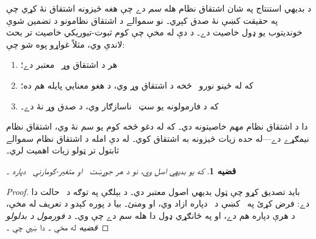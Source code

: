 \documentclass[12pt,a4paper,oneside]{report}
\newcommand{\olfileid}[3]{\gdef\pspart{#1}\gdef\pschapter{#2}\gdef\pssection{#3}}
\gdef\pspart{#2}\gdef\pschapter{#3}\gdef\pssection{}%
\newtheorem{prop}[thm]{قضيه}
\theoremstyle{definition}
\newenvironment{explain}{}{}
\begin{document}
\label{olpseg:OLP-0124-B004:start}
\olfileid{fol}{axd}{sou}
\label{olpseg:OLP-0124-B004:end}

\label{olpseg:OLP-0124-B005:start}
\label{olpseg:OLP-0124-B005:end}

\label{olpseg:OLP-0124-B006:start}
\begin{explain}
د بديهي استنتاج په شان اشتقاق نظام هله \emph{سم} دے چې
هغه څيزونه اشتقاق نۀ کړي چې په حقيقت کښې نۀ صدق کېږي۔ نو
سموالے د اشتقاق نظامونو د تضمين شوې خونديتوب يو ډول خاصيت
دے۔ د دې له مخې چې کوم ثبوت-تيوريکي خاصيت تر بحث لاندې وي، مثلاً
غواړو پوه شو چې:
\begin{enumerate}
\item هر د اشتقاق وړ~ معتبر دے؛
\item که  له ځينو نورو~\LR{$\Gamma$} څخه د اشتقاق وړ وي، د هغو
  معنايي پايله هم ده؛
\item که د فارمولونه يو سټ~\LR{$\Gamma$} ناسازګار وي، د صدق وړ نۀ
  دے۔
\end{enumerate}
دا د اشتقاق نظام مهم خاصيتونه دي۔ که له دغو څخه کوم يو
سم نۀ وي، اشتقاق نظام نيمګړے دے---له حده زيات څيزونه به
اشتقاق کوي۔ له دې امله د اشتقاق نظام سموالے ثابتول
تر ټولو زيات اهميت لري۔
\end{explain}
\label{olpseg:OLP-0124-B006:end}

\label{olpseg:OLP-0124-B007:start}
\begin{prop}
  که  يو بديهي اصل وي، نو
  د هر جوړښت~ او متغير-ګومارنې~ دپاره ۔
\end{prop}
\label{olpseg:OLP-0124-B007:end}

\label{olpseg:OLP-0124-B008:start}
\begin{proof}
بايد تصديق کړو چې ټول بديهي اصول معتبر دي۔ د بېلګې
  په توګه د~ حالت دا دے: فرض کړئ  په~
  کښې د~ دپاره ازاد وي، او
   ومنئ۔ بيا د پوره کېدو د تعريف له
  مخې، د هرې  دپاره  هم
  دے، او په ځانګړي ډول دا هله سم دے چې
   وي۔ د
  \emph{فورمول د بدلولو قضيه}\nobreakspace{} له مخې
  ۔ دا ښيي چې
  ۔
\end{proof}
\label{olpseg:OLP-0124-B008:end}
\end{document}
